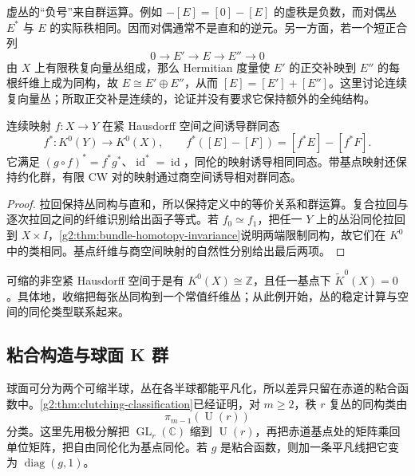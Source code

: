 \ProseParagraphBreak

虚丛的“负号”来自群运算。例如 \(-[E]=[0]-[E]\) 的虚秩是负数，而对偶丛 \(E^*\) 与 \(E\) 的实际秩相同。因而对偶通常不是直和的逆元。另一方面，若一个短正合列
\[
	0\longrightarrow E'\longrightarrow E\longrightarrow E''\longrightarrow0
\]
由 \(X\) 上有限秩复向量丛组成，那么 Hermitian 度量使 \(E'\) 的正交补映到 \(E''\) 的每根纤维上成为同构，故 \(E\cong E'\oplus E''\)，从而 \([E]=[E']+[E'']\)。这里讨论连续复向量丛；所取正交补是连续的，论证并没有要求它保持额外的全纯结构。

\begin{proposition}\label{g2:prop:k-pullback-homotopy}
	连续映射 \(f:X\to Y\) 在紧 Hausdorff 空间之间诱导群同态
	\[
		f^*:K^0(Y)\longrightarrow K^0(X),\qquad
		f^*([E]-[F])=[f^*E]-[f^*F].
	\]
	它满足 \((g\circ f)^*=f^*g^*\)、\(\operatorname{id}^*=\operatorname{id}\)，同伦的映射诱导相同同态。带基点映射还保持约化群，有限 CW 对的映射通过商空间诱导相对群同态。
\end{proposition}
\begin{proof}
	拉回保持丛同构与直和，所以保持定义中的等价关系和群运算。复合拉回与逐次拉回之间的纤维识别给出函子等式。若 \(f_0\simeq f_1\)，把任一 \(Y\) 上的丛沿同伦拉回到 \(X\times I\)，\cref{g2:thm:bundle-homotopy-invariance}说明两端限制同构，故它们在 \(K^0\) 中的类相同。基点纤维与商空间映射的自然性分别给出最后两项。
\end{proof}

可缩的非空紧 Hausdorff 空间于是有 \(K^0(X)\cong\mathbb Z\)，且任一基点下 \(\widetilde K^0(X)=0\)。具体地，收缩把每张丛同构到一个常值纤维丛；从此例开始，丛的稳定计算与空间的同伦类型联系起来。

\subsection{粘合构造与球面 K 群}
\label{g2:subsec:2401:03}
球面可分为两个可缩半球，丛在各半球都能平凡化，所以差异只留在赤道的粘合函数中。\cref{g2:thm:clutching-classification}已经证明，对 \(m\ge2\)，秩 \(r\) 复丛的同构类由
\[
	\pi_{m-1}(\operatorname{U}(r))
\]
分类。这里先用极分解把 \(\operatorname{GL}_r(\mathbb C)\) 缩到 \(\operatorname{U}(r)\)，再把赤道基点处的矩阵乘回单位矩阵，把自由同伦化为基点同伦。若 \(g\) 是粘合函数，则加一条平凡线把它变为 \(\operatorname{diag}(g,1)\)。

